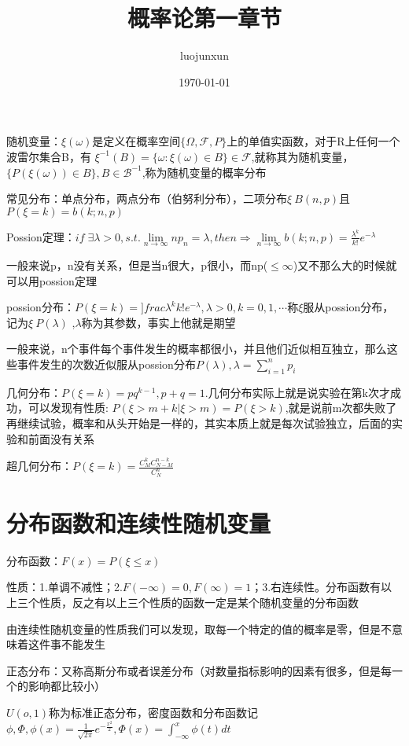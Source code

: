 \documentclass[12pt, a4paper, oneside]{ctexart}
\title{\huge\textbf{概率论第一章节}}
\author{luojunxun}
\date{\today}
\begin{document}
\maketitle

随机变量：$\xi(\omega)$是定义在概率空间$\{\Omega,\mathcal{F},P\}$上的单值实函数，对于R上任何一个波雷尔集合B，有
$\xi^{-1}(B)=\{\omega:\xi(\omega)\in B\}\in\mathcal{F}$,就称其为随机变量，$\{P(\xi(\omega))\in B\},B\in\mathcal{B}^{-1}$,称为随机变量的概率分布

常见分布：单点分布，两点分布（伯努利分布），二项分布$\xi ~ B(n,p)$且$P(\xi = k)=b(k;n,p)$

Possion定理：$if\;\exists\lambda>0,s.t.\lim\limits_{n\to\infty}np_n=\lambda,then\Rightarrow \lim\limits_{n\to\infty}b(k;n,p)=\frac{\lambda^k}{k!}e^{-\lambda} $

一般来说p，n没有关系，但是当n很大，p很小，而np($\leq\infty$)又不那么大的时候就可以用possion定理

possion分布：$P(\xi =k)=]frac{\lambda^k}{k!}e^{-\lambda},\lambda>0,k=0,1,\cdots$称$\xi$服从possion分布，记为$\xi ~P(\lambda)$
,$\lambda$称为其参数，事实上他就是期望

一般来说，n个事件每个事件发生的概率都很小，并且他们近似相互独立，那么这些事件发生的次数近似服从possion分布$P(\lambda),\lambda = \sum\limits_{i=1}^np_i$

几何分布：$P(\xi=k)=pq^{k-1},p+q=1$.几何分布实际上就是说实验在第k次才成功，可以发现有性质:
$P(\xi>m+k|\xi>m)=P(\xi>k)$,就是说前m次都失败了再继续试验，概率和从头开始是一样的，其实本质上就是每次试验独立，后面的实验和前面没有关系

超几何分布：$P(\xi=k)=\frac{C_M^kC_{N-M}^{n-k}}{C_N^n}$

\section*{分布函数和连续性随机变量}

分布函数：$F(x)=P(\xi \leq x)$

性质：1.单调不减性；2.$F(-\infty)=0,F(\infty)=1$；3.右连续性。分布函数有以上三个性质，反之有以上三个性质的函数一定是某个随机变量的分布函数

由连续性随机变量的性质我们可以发现，取每一个特定的值的概率是零，但是不意味着这件事不能发生

正态分布：又称高斯分布或者误差分布（对数量指标影响的因素有很多，但是每一个的影响都比较小）

$U(o,1)$称为标准正态分布，密度函数和分布函数记$\phi,\Phi,\phi(x)=\frac{1}{\sqrt{2\pi}} e ^{-\frac{x^2}{2}},\Phi(x)=\int_{-\infty}^x\phi(t)dt$
\end{document}
